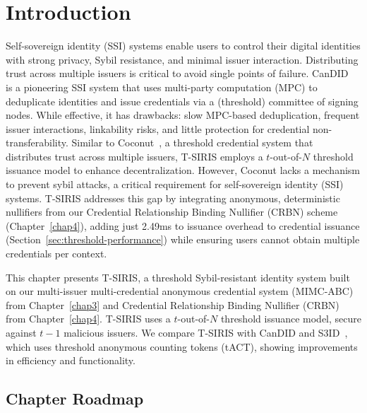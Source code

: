 \label{chap6}

\section{Introduction}\label{sec:threshold-intro}
Self-sovereign identity (SSI) systems enable users to control their digital identities with strong privacy, Sybil resistance, and minimal issuer interaction. Distributing trust across multiple issuers is critical to avoid single points of failure. CanDID~\cite{maram_candid_2020} is a pioneering SSI system that uses multi-party computation (MPC) to deduplicate identities and issue credentials via a (threshold) committee of signing nodes. While effective, it has drawbacks: slow MPC-based deduplication, frequent issuer interactions, linkability risks, and little protection for credential non-transferability. Similar to Coconut~\cite{sonnino_coconut_2020}, a threshold credential system that distributes trust across multiple issuers, T-SIRIS employs a $t$-out-of-$N$ threshold issuance model to enhance decentralization. However, Coconut lacks a mechanism to prevent sybil attacks, a critical requirement for self-sovereign identity (SSI) systems. T-SIRIS addresses this gap by integrating anonymous, deterministic nullifiers from our Credential Relationship Binding Nullifier (CRBN) scheme (Chapter~\ref{chap4}), adding just 2.49ms to issuance overhead to credential issuance (Section~\ref{sec:threshold-performance}) while ensuring users cannot obtain multiple credentials per context.

This chapter presents T-SIRIS, a threshold Sybil-resistant identity system built on our multi-issuer multi-credential anonymous credential system (MIMC-ABC) from Chapter~\ref{chap3} and Credential Relationship Binding Nullifier (CRBN) from Chapter~\ref{chap4}. T-SIRIS uses a $t$-out-of-$N$ threshold issuance model, secure against $t-1$ malicious issuers. We compare T-SIRIS with CanDID and S3ID~\cite{rabaninejad_attribute-based_2024}, which uses threshold anonymous counting tokens (tACT), showing improvements in efficiency and functionality.


\subsection*{Chapter Roadmap}

